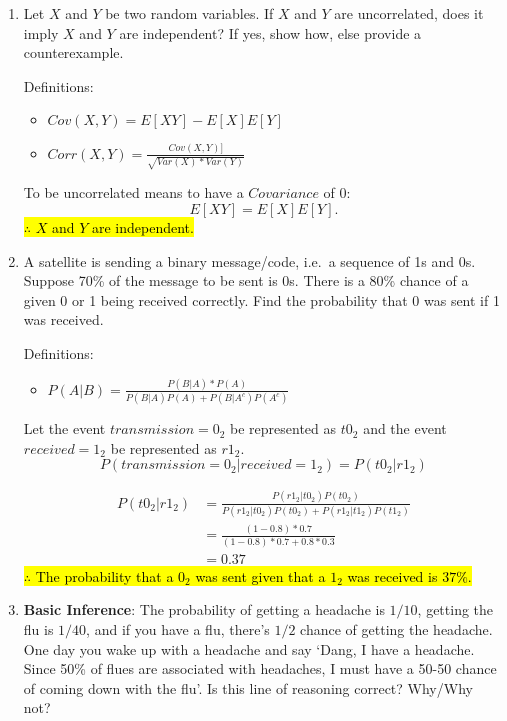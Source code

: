 \documentclass[11pt,onecolumn]{article}
\begin{document}
\begin{enumerate}
    \item Let $X$ and $Y$ be two random variables. If $X$ and $Y$ are uncorrelated, does it imply $X$ and $Y$ are independent? If yes, show how, else provide a counterexample. 
    \setlength{\parskip}{6pt}

    Definitions:
    \begin{itemize}
        \item $Cov(X,Y) = E[XY] - E[X]E[Y]$
        \item $Corr(X,Y) = \frac{Cov(X,Y)]}{\sqrt{Var(X)*Var(Y)}}$
    \end{itemize}
    To be uncorrelated means to have a $Covariance$ of 0:
    \begin{equation}
        E[XY] = E[X]E[Y].
    \end{equation}
    \hl{$\therefore$ $X$ and $Y$ are independent.} 
    
    \item A satellite is sending a binary message/code, i.e.\ a sequence of 1s and 0s. Suppose 70\% of the message to be sent is 0s. There is a 80\% chance of a given 0 or 1 being received correctly. Find the probability that 0 was sent if 1 was received. 
    \setlength{\parskip}{6pt}

    Definitions:
    \begin{itemize}
        \item $P(A \vert B) = \frac{P(B \vert A)*P(A)}{P(B \vert A)P(A) + P(B \vert A^c)P(A^c)}$
    \end{itemize}
    Let the event $transmission=0_2$ be represented as $t0_2$ and the event  $received = 1_2$ be represented as $r1_2$.
    \begin{equation}
        P(transmission=0_2 \vert received = 1_2) =  P(t0_2 \vert r1_2)
    \end{equation}
    
    \begin{equation}
        \begin{aligned}
        P(t0_2 \vert r1_2) & =  \frac{P(r1_2 \vert t0_2)P(t0_2)}{P(r1_2 \vert t0_2)P(t0_2) + P(r1_2 \vert t1_2)P(t1_2)} \\ 
        & = \frac{(1-0.8)*0.7}{(1-0.8)*0.7 + 0.8*0.3} \\
        & = 0.37
        \end{aligned}
    \end{equation}
    \hl{$\therefore$ The probability that a $0_2$ was sent given that a $1_2$ was received is $37\%$.}
    \item \textbf{Basic Inference}: The probability of getting a headache is $1/10$, getting the flu is $1/40$, and if you have a flu, there's $1/2$ chance of getting the headache. One day you wake up with a headache and say `Dang, I have a headache. Since 50\% of flues are associated with headaches, I must have a 50-50 chance of coming down with the flu'. Is this line of reasoning correct? Why/Why not?
    \setlength{\parskip}{6pt}


\end{enumerate}
\end{document}
